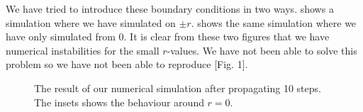 We have tried to introduce these boundary conditions in two ways.  shows a
simulation where we have simulated on $\pm r$.  shows the same simulation
where we have only simulated from 0. It is clear from these two figures that we have numerical
instabilities for the small $r$-values. We have not been able to solve this problem so we have not
been able to reproduce \cite{prl-selffocus}[Fig. 1]. 
\begin{figure}[htb]
  \centering
  \hfill
  \caption{The result of our numerical simulation after propagating 10 steps. The insets shows the
    behaviour around $r=0$.}
  \label{fig:kerr-num}
\end{figure}



